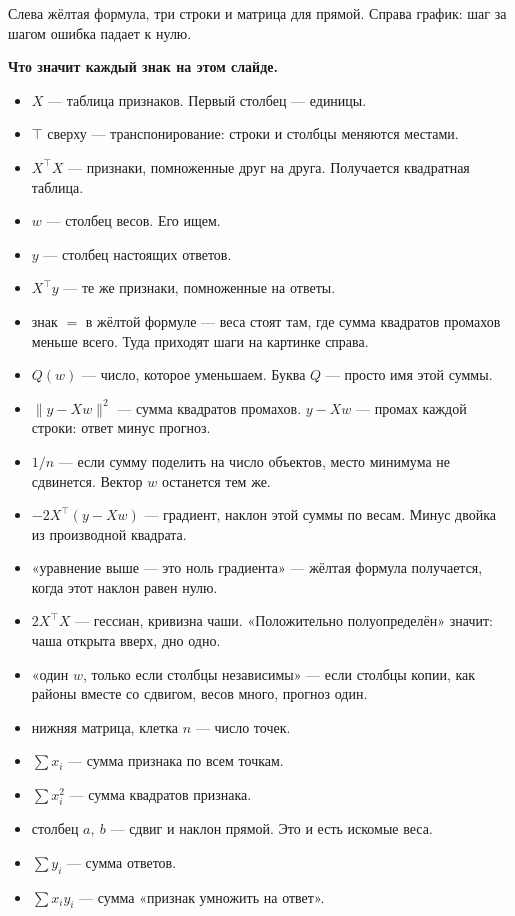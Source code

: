\documentclass[11pt,a4paper]{article}
\newcommand{\slidehead}[2]{\par\vspace{4mm}{\color{navy}\large\bfseries Слайд #1. #2}\par\vspace{1mm}}
\newcommand{\screen}[1]{\par{\color{ink}\small #1\par}\vspace{1mm}}
\newenvironment{signs}{\begin{signbox}{\bfseries Что значит каждый знак на этом слайде.}\par\begin{itemize}[leftmargin=1.15em,itemsep=2pt,topsep=3pt,parsep=0pt]}{\end{itemize}\end{signbox}}
\begin{document}
\slidehead{12}{Нормальные уравнения}
\screen{Слева жёлтая формула, три строки и матрица для прямой. Справа график: шаг за шагом ошибка падает к нулю.}
\begin{signs}
\item \(X\) — таблица признаков. Первый столбец — единицы.
\item \(\top\) сверху — транспонирование: строки и столбцы меняются местами.
\item \(X^{\top}X\) — признаки, помноженные друг на друга. Получается квадратная таблица.
\item \(w\) — столбец весов. Его ищем.
\item \(y\) — столбец настоящих ответов.
\item \(X^{\top}y\) — те же признаки, помноженные на ответы.
\item знак \(=\) в жёлтой формуле — веса стоят там, где сумма квадратов промахов меньше всего. Туда приходят шаги на картинке справа.
\item \(Q(w)\) — число, которое уменьшаем. Буква \(Q\) — просто имя этой суммы.
\item \(\|y-Xw\|^{2}\) — сумма квадратов промахов. \(y-Xw\) — промах каждой строки: ответ минус прогноз.
\item \(1/n\) — если сумму поделить на число объектов, место минимума не сдвинется. Вектор \(w\) останется тем же.
\item \(-2X^{\top}(y-Xw)\) — градиент, наклон этой суммы по весам. Минус двойка из производной квадрата.
\item «уравнение выше — это ноль градиента» — жёлтая формула получается, когда этот наклон равен нулю.
\item \(2X^{\top}X\) — гессиан, кривизна чаши. «Положительно полуопределён» значит: чаша открыта вверх, дно одно.
\item «один \(w\), только если столбцы независимы» — если столбцы копии, как районы вместе со сдвигом, весов много, прогноз один.
\item нижняя матрица, клетка \(n\) — число точек.
\item \(\sum x_i\) — сумма признака по всем точкам.
\item \(\sum x_i^{2}\) — сумма квадратов признака.
\item столбец \(a,\ b\) — сдвиг и наклон прямой. Это и есть искомые веса.
\item \(\sum y_i\) — сумма ответов.
\item \(\sum x_i y_i\) — сумма «признак умножить на ответ».
\end{signs}
\end{document}
